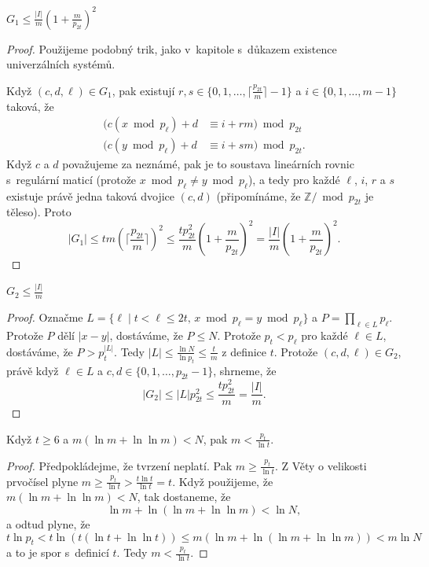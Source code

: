 \documentclass[a4paper,12pt]{article}
\begin{document}
\begin{veta}
    $G_1\le\frac {|I|}m(1+\frac m{p_{2t}})^2$
\end{veta} 
\begin{proof}
Použijeme podobný trik, jako v~kapitole s~důkazem existence univerzálních systémů.

    Když $(c,d,\ell )\in G_1$, pak 
existují $r,s\in \{0,1,\dots,\lceil\frac {p_{2t}}m\rceil -1\}$ a $
i\in \{0,1,\dots,m-1\}$ 
taková, že 
\begin{align*}(c(x\bmod p_{\ell})+d&\equiv i+rm)\bmod p_{2t}\\
(c(y\bmod p_{\ell})+d&\equiv i+sm)\bmod p_{2t}.\end{align*}
Když $c$ a $d$ považujeme za neznámé, pak je to  
soustava lineár\-ních rovnic s~regulární maticí (protože 
$x\bmod p_{\ell}\ne y\bmod p_{\ell}$), a tedy pro každé $\ell$, $
i$, $r$ a $s$ 
existuje právě jedna taková dvojice $(c,d)$ (připomínáme, že $\mathbb Z/\bmod p_{2t}$ je těleso). Proto 
$$|G_1|\le tm(\lceil\frac {p_{2t}}m\rceil )^2\le\frac {tp_{2t}^2}
m(1+\frac m{p_{2t}})^2=\frac {|I|}m(1+\frac m{p_{2t}})^2.$$
\end{proof}

\begin{veta}
    $G_2\le\frac {|I|}m$
\end{veta}

\begin{proof}
    Označme 
$L=\{\ell\mid t<\ell\le 2t,\,x\bmod p_{\ell}=y\bmod p_{\ell}\}$ a $
P=\prod_{\ell\in L}p_{\ell}$. 
Protože $P$ dělí $|x-y|$, dostáváme, že $P\le N$. Protože 
$p_t<p_{\ell}$ pro každé $\ell\in L$, dostáváme, že $
P>p_t^{|L|}$. Tedy 
$|L|\le\frac {\ln N}{\ln p_t}\le\frac tm$ z definice $t$. Protože $
(c,d,\ell )\in G_2$, právě 
když $\ell\in L$ a $c,d\in \{0,1,\dots,p_{2t}-1\}$, shrneme, že 
$$|G_2|\le |L|p_{2t}^2\le\frac {tp_{2t}^2}m=\frac {|I|}m.$$
\end{proof}

\begin{lemma}Když $t\ge 6$ a $m(\ln m+\ln\ln m)<N$, pak $m<\frac {
p_t}{\ln t}$.
\end{lemma}

\begin{proof}Předpokládejme, že tvrzení neplatí. Pak $
m\ge\frac {p_t}{\ln t}$. Z Věty o velikosti 
prvo\-čí\-sel plyne $m\ge\frac {p_t}{\ln t}>\frac {t\ln 
t}{\ln t}=t$. Když použijeme, že 
$m(\ln m+\ln\ln m)<N$, tak dostaneme, že 
$$\ln m+\ln(\ln m+\ln\ln m)<\ln N,$$
a odtud plyne, že 
$$t\ln p_t<t\ln(t(\ln t+\ln\ln t))\le m(\ln m+\ln(\ln m+\ln\ln m)
)<m\ln N$$
a to je spor s~definicí $t$. Tedy $m<\frac {p_t}{\ln t}$.
\end{proof}
\end{document}
